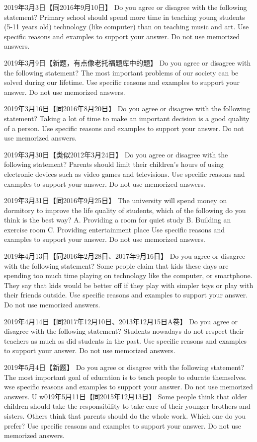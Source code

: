 2019年3月3日【同2016年9月10日】
Do you agree or disagree with the following statement?
Primary school should spend more time in teaching young students (5-11 years old) technology (like computer) than on teaching music and art.
Use specific reasons and examples to support your answer. Do not use memorized answers.

2019年3月9日【新题，有点像老托福题库中的题】
Do you agree or disagree with the following statement?
The most important problems of our society can be solved during our lifetime.
Use specific reasons and examples to support your answer. Do not use memorized answers.

2019年3月16日【同2016年8月20日】
Do you agree or disagree with the following statement?
Taking a lot of time to make an important decision is a good quality of a person.
Use specific reasons and examples to support your answer. Do not use memorized answers.

2019年3月30日【类似2012年3月24日】
Do you agree or disagree with the following statement?
Parents should limit their children's hours of using electronic devices such as video games and televisions.
Use specific reasons and examples to support your answer. Do not use memorized answers.

2019年3月31日【同2016年9月25日】
The university will spend money on dormitory to improve the life quality of students, which of the following do you think is the best way?
A. Providing a room for quiet study
B. Building an exercise room
C. Providing entertainment place
Use specific reasons and examples to support your answer. Do not use memorized answers.

2019年4月13日【同2016年2月28日、2017年9月16日】
Do you agree or disagree with the following statement?
Some people claim that kids these days are spending too much time playing on technology like the computer, or smartphone. They say that kids would be better off if they play with simpler toys or play with their friends outside.
Use specific reasons and examples to support your answer. Do not use memorized answers.



2019年4月14日【同2017年12月10日、2013年12月15日A卷】
Do you agree or disagree with the following statement?
Students nowadays do not respect their teachers as much as did students in the past.
Use specific reasons and examples to support your answer. Do not use memorized answers.

2019年5月4日【新题】
Do you agree or disagree with the following statement?
The most important goal of education is to teach people to educate themselves.
wse specific reasons and examples to support your answer. Do not use memorized answers.
U
w019年5月11日【同2015年12月13日】
Some people think that older children should take the responsibility to take care of their younger brothers and sisters. Others think that parents should do the whole work. Which one do you prefer?
Use specific reasons and examples to support your answer. Do not use memorized answers.

